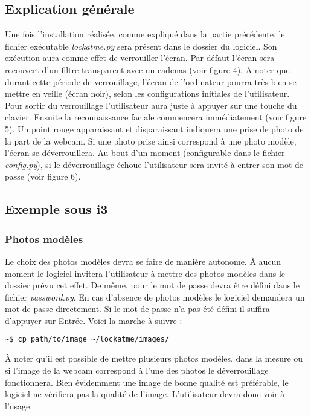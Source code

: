   \subsection{Explication générale}
Une fois l'installation réalisée, comme expliqué dans la partie précédente,
le fichier exécutable \emph{lockatme.py} sera présent dans le dossier du logiciel. Son
exécution aura comme effet de verrouiller l'écran. Par défaut l'écran sera
recouvert d'un filtre transparent avec un cadenas (voir figure 4). A noter que
durant cette période de verrouillage, l'écran de l'ordinateur pourra très bien
se mettre en veille (écran noir), selon les configurations initiales de
l'utilisateur.
Pour sortir du verrouillage l'utilisateur aura juste à appuyer sur une touche
du clavier. Ensuite la reconnaissance faciale commencera immédiatement (voir
figure 5).
Un point rouge apparaissant et disparaissant indiquera une prise de
photo de la part de la webcam. Si une photo prise ainsi correspond à une photo
modèle, l'écran se déverrouillera. Au bout d'un moment (configurable dans le
fichier \emph{config.py}), si le déverrouillage échoue l'utilisateur sera invité à
entrer son mot de passe (voir figure 6).

  \subsection{Exemple sous i3}
    \subsubsection{Photos modèles}
Le choix des photos modèles devra se faire de manière autonome. À aucun moment
le logiciel invitera l'utilisateur à mettre des photos modèles dans le dossier
prévu cet effet. De même, pour le mot de passe devra être défini dans le
fichier \emph{password.py}. En cas d'absence de photos
modèles le logiciel demandera un mot de passe directement. Si le mot de passe
n'a pas été défini il suffira d'appuyer sur Entrée.
Voici la marche à suivre :
\begin{lstlisting}[language=bash]
  ~$ cp path/to/image ~/lockatme/images/
\end{lstlisting}
À noter qu'il est possible de mettre plusieurs photos modèles, dans la mesure
ou si l'image de la webcam correspond à l'une des photos le déverrouillage
fonctionnera.
\vspace{0.5cm}
Bien évidemment une image de bonne qualité est préférable, le logiciel ne
vérifiera pas la qualité de l'image. L'utilisateur devra donc voir à l'usage.

